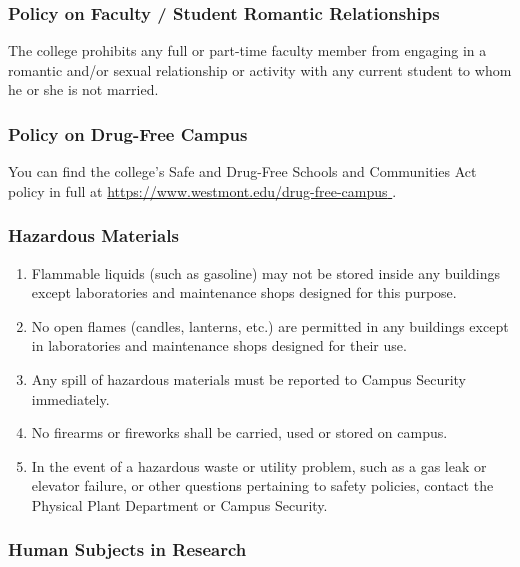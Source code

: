 		\subsubsection{Policy on Faculty / Student Romantic Relationships}
			The college prohibits any full or part-time faculty member from engaging in a romantic and/or sexual relationship or activity with any current student to whom he or she is not married.
		\subsubsection{Policy on Drug-Free Campus}
			You can find the college's Safe and Drug-Free Schools and Communities Act policy in full at
			\href{
				https://www.westmont.edu/drug-free-campus
			}
			{
				\url{https://www.westmont.edu/drug-free-campus}
			}.
		\subsubsection{Hazardous Materials}

			\begin{enumerate}[label=\alph*)]

				\item{ Flammable liquids (such as gasoline) may not be stored inside
					any buildings except laboratories and maintenance shops designed for
					this purpose. }

				\item{ No open flames (candles, lanterns, etc.) are permitted in any
					buildings except in laboratories and maintenance shops designed for
					their use. }

				\item{ Any spill of hazardous materials must be reported to Campus
					Security immediately. }

				\item{ No firearms or fireworks shall be carried, used or stored on
					campus. }

				\item{ In the event of a hazardous waste or utility problem, such as
					a gas leak or elevator failure, or other questions pertaining to
					safety policies, contact the Physical Plant Department or Campus
					Security. }

			\end{enumerate}
		\subsubsection{Human Subjects in Research}

